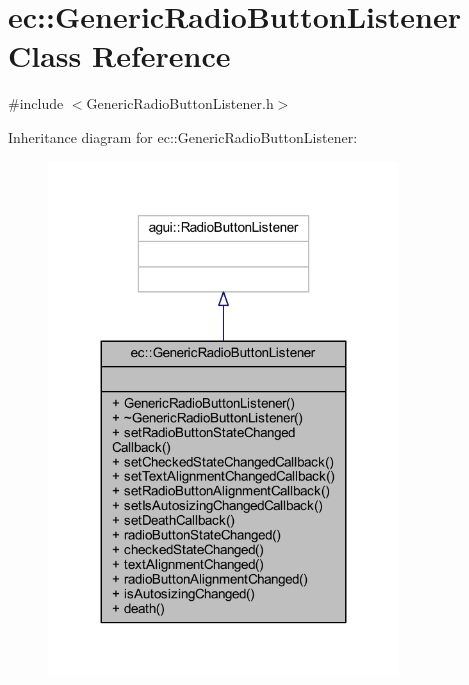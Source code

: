 \hypertarget{classec_1_1_generic_radio_button_listener}{}\section{ec\+:\+:Generic\+Radio\+Button\+Listener Class Reference}
\label{classec_1_1_generic_radio_button_listener}


{\ttfamily \#include $<$Generic\+Radio\+Button\+Listener.\+h$>$}



Inheritance diagram for ec\+:\+:Generic\+Radio\+Button\+Listener\+:\nopagebreak
\begin{figure}[H]
\begin{center}
\leavevmode
\includegraphics[width=263pt]{classec_1_1_generic_radio_button_listener__inherit__graph}
\end{center}
\end{figure}


